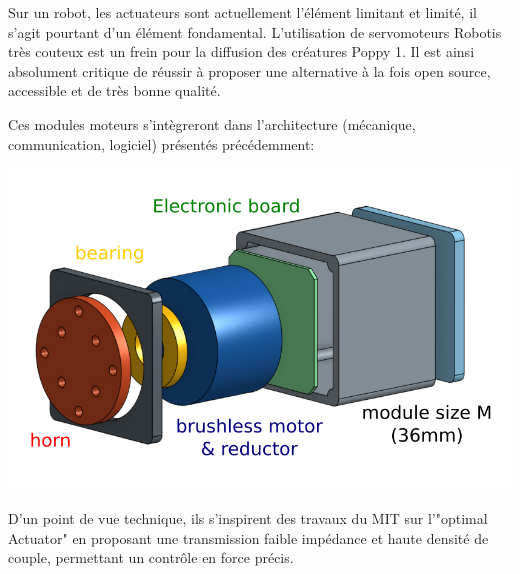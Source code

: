 \documentclass[a0,final, portrait]{inriaposter}
\begin{document}
\begin{multicols}{2}
 {

Sur un robot, les actuateurs sont actuellement l'élément limitant et limité, il s'agit pourtant d'un élément fondamental. L'utilisation de servomoteurs Robotis très couteux est un frein pour la diffusion des créatures Poppy 1. Il est ainsi absolument critique de réussir à proposer une alternative à la fois open source, accessible et de très bonne qualité.

Ces modules moteurs s'intègreront dans l'architecture (mécanique, communication, logiciel) présentés précédemment:

\begin{center}
        \includegraphics[width=0.75\columnwidth]{images/module_moteur.png}
\end{center}

D'un point de vue technique, ils s'inspirent des travaux du MIT sur l'"optimal Actuator" en proposant une transmission faible impédance et haute densité de couple, permettant un contrôle en force précis.

}

\end{multicols}
\end{document}
